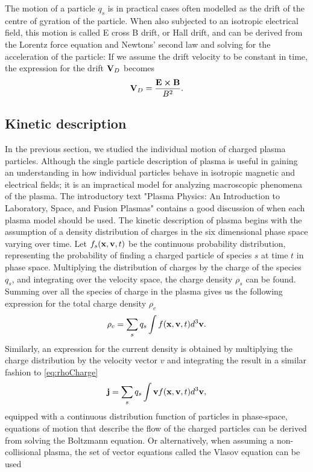 The motion of a particle $q_s$ is in practical cases often modelled as the drift of the centre of gyration of the particle. When also subjected to an isotropic electrical field, this motion is called E cross B drift, or Hall drift, and can be derived from the Lorentz force equation and Newtons' second law and solving for the acceleration of the particle: If we assume the drift velocity to be constant in time, the expression for the drift $\vb{V}_D$ becomes
\begin{equation}
    \vb{V}_D = \frac{\vb{E} \cp \vb{B}}{B^2}.
\end{equation}

\subsection{Kinetic description}
In the previous section, we studied the individual motion of charged plasma particles. Although the single particle description of plasma is useful in gaining an understanding in how individual particles behave in isotropic magnetic and electrical fields; it is an impractical model for analyzing macroscopic phenomena of the plasma. The introductory text "Plasma Physics: An Introduction to Laboratory, Space, and Fusion Plasmas" \parencite{Piel2017} contains a good discussion of when each plasma model should be used. The kinetic description of plasma begins with the assumption of a density distribution of charges in the six dimensional phase space varying over time. Let $f_s(\vb{x}, \vb{v}, t)$ be the continuous probability distribution, representing the probability of finding a charged particle of species $s$ at time $t$ in phase space. Multiplying the distribution of charges by the charge of the species $q_s$, and integrating over the velocity space, the charge density $\rho_s$ can be found. Summing over all the species of charge in the plasma gives us the following expression for the total charge density $\rho_c$
\begin{equation}\label{eq:rhoCharge}
    \rho_c = \sum_s q_s\int f(\vb{x}, \vb{v}, t) d^3\vb{v}.
\end{equation}
Similarly, an expression for the current density is obtained by multiplying the charge distribution by the velocity vector $v$ and integrating the result in a similar fashion to \eqref{eq:rhoCharge}
\begin{equation}
    \vb{j} = \sum_s q_s \int \vb{v} f(\vb{x}, \vb{v}, t) d^3 \vb{v},
\end{equation}
equipped with a continuous distribution function of particles in phase-space, equations of motion that describe the flow of the charged particles can be derived from solving the Boltzmann equation. Or alternatively, when assuming a non-collisional plasma, the set of vector equations called the Vlasov equation can be used
